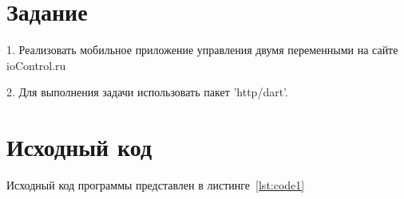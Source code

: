 \documentclass[a4paper, 14pt]{extarticle}
\begin{document}
\renewcommand{\ttdefault}{pcr}

\setlength{\tabcolsep}{3pt}
\newpage
\setcounter{page}{2}

\section{Задание}\label{Sect::task}
1. Реализовать мобильное приложение управления двумя переменными на сайте ioControl.ru

2. Для выполнения задачи использовать пакет 'http/dart'.
\newpage
\section{Исходный код}

Исходный код программы представлен в листинге~\ref{lst:code1}
\end{document}
